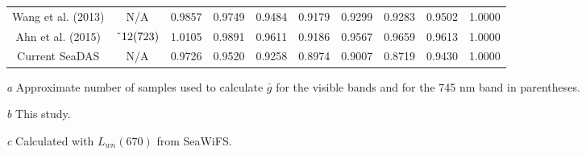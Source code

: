 \documentclass[preview]{standalone}
\begin{document}
\begin{threeparttable}
\begin{tabular}{cccccccccc}
Wang et al. (2013)& 	N/A				& 0.9857 			& 0.9749 			& 0.9484 			& 0.9179 			& 0.9299 & 0.9283 & 0.9502 & 1.0000 \\
Ahn et al. (2015)& 	$\char`\~12(723)$ & 1.0105 & 0.9891 & 0.9611 & 0.9186 & 0.9567 & 0.9659 & 0.9613 & 1.0000 \\
Current SeaDAS 	& N/A	& 0.9726 & 0.9520 & 0.9258 & 0.8974 & 0.9007 & 0.8719 & 0.9430 & 1.0000 \\

\hline 
\end{tabular}
\begin{tablenotes}
\small
\item [\it a] Approximate number of samples used to calculate $\bar{g}$ for the visible bands and for the 745 nm band in parentheses.
\item [\it b] This study.
\item [\it c] Calculated with $L_{wn}(670)$ from SeaWiFS.
\end{tablenotes}
\end{threeparttable}
\end{document}
